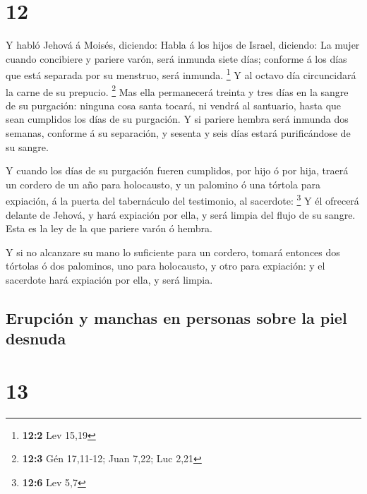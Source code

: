 \hypertarget{section-11}{%
\section{12}\label{section-11}}

 Y habló Jehová á Moisés, diciendo:  Habla á
los hijos de Israel, diciendo: La mujer cuando concibiere y pariere
varón, será inmunda siete días; conforme á los días que está separada
por su menstruo, será inmunda. \footnote{\textbf{12:2} Lev 15,19}
 Y al octavo día circuncidará la carne de su prepucio.
\footnote{\textbf{12:3} Gén 17,11-12; Juan 7,22; Luc 2,21}
 Mas ella permanecerá treinta y tres días en la sangre de
su purgación: ninguna cosa santa tocará, ni vendrá al santuario, hasta
que sean cumplidos los días de su purgación.  Y si pariere
hembra será inmunda dos semanas, conforme á su separación, y sesenta y
seis días estará purificándose de su sangre.

 Y cuando los días de su purgación fueren cumplidos, por
hijo ó por hija, traerá un cordero de un año para holocausto, y un
palomino ó una tórtola para expiación, á la puerta del tabernáculo del
testimonio, al sacerdote: \footnote{\textbf{12:6} Lev 5,7}
 Y él ofrecerá delante de Jehová, y hará expiación por
ella, y será limpia del flujo de su sangre. Esta es la ley de la que
pariere varón ó hembra.

 Y si no alcanzare su mano lo suficiente para un cordero,
tomará entonces dos tórtolas ó dos palominos, uno para holocausto, y
otro para expiación: y el sacerdote hará expiación por ella, y será
limpia.

\hypertarget{erupciuxf3n-y-manchas-en-personas-sobre-la-piel-desnuda}{%
\subsection{Erupción y manchas en personas sobre la piel
desnuda}\label{erupciuxf3n-y-manchas-en-personas-sobre-la-piel-desnuda}}

\hypertarget{section-12}{%
\section{13}\label{section-12}}

